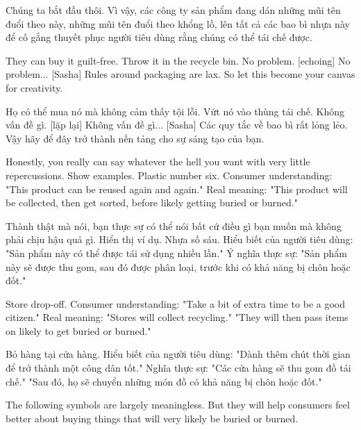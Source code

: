 \documentclass[a4paper]{article}
\begin{document}
	\begin{vietnamese-v2}
		Chúng ta bắt đầu thôi.
		Vì vậy, các công ty sản phẩm đang dán những mũi tên đuổi theo này, những mũi tên đuổi theo khổng lồ, lên tất cả các bao bì nhựa này để cố gắng thuyết phục người tiêu dùng rằng chúng có thể tái chế được.
	\end{vietnamese-v2}
	
	They can buy it guilt-free.
	Throw it in the recycle bin.
	No problem.
	[echoing] No problem...
	[Sasha] Rules around packaging are lax.
	So let this become your canvas for creativity.
	
	\begin{vietnamese-v2}
		Họ có thể mua nó mà không cảm thấy tội lỗi.
		Vứt nó vào thùng tái chế.
		Không vấn đề gì.
		[lặp lại] Không vấn đề gì...
		[Sasha] Các quy tắc về bao bì rất lỏng lẻo.
		Vậy hãy để đây trở thành nền tảng cho sự sáng tạo của bạn.
	\end{vietnamese-v2}
	
	Honestly, you really can say whatever the hell you want with very little repercussions.
	Show examples.
	Plastic number six.
	Consumer understanding:
	"This product can be reused again and again." Real meaning: "This product will be collected, then get sorted, before likely getting buried or burned."
	
	\begin{vietnamese-v2}
		Thành thật mà nói, bạn thực sự có thể nói bất cứ điều gì bạn muốn mà không phải chịu hậu quả gì.
		Hiển thị ví dụ.
		Nhựa số sáu.
		Hiểu biết của người tiêu dùng:
		"Sản phẩm này có thể được tái sử dụng nhiều lần." Ý nghĩa thực sự: "Sản phẩm này sẽ được thu gom, sau đó được phân loại, trước khi có khả năng bị chôn hoặc đốt."
	\end{vietnamese-v2}
	
	Store drop-off.
	Consumer understanding: "Take a bit of extra time to be a good citizen."
	Real meaning: "Stores will collect recycling."
	"They will then pass items on likely to get buried or burned."
	
	\begin{vietnamese-v2}
		Bỏ hàng tại cửa hàng.
		Hiểu biết của người tiêu dùng: "Dành thêm chút thời gian để trở thành một công dân tốt."
		Nghĩa thực sự: "Các cửa hàng sẽ thu gom đồ tái chế."
		"Sau đó, họ sẽ chuyển những món đồ có khả năng bị chôn hoặc đốt."
	\end{vietnamese-v2}
	
	The following symbols are largely meaningless.
	But they will help consumers feel better about buying things that will very likely be buried or burned.
	
\end{document}
